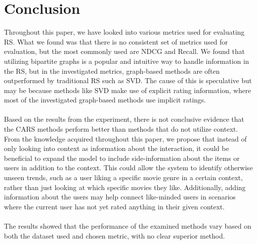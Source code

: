 \section{Conclusion}\label{sec:conclusion}
Throughout this paper, we have looked into various metrics used for evaluating RS. What we found was that there is no consistent set of metrics used for evaluation, but the most commonly used are NDCG and Recall.
We found that utilizing bipartite graphs is a popular and intuitive way to handle information in the RS, but in the investigated metrics, graph-based methods are often outperformed by traditional RS such as SVD.
The cause of this is speculative but may be because methods like SVD make use of explicit rating information, where most of the investigated graph-based methods use implicit ratings.
\\\\
Based on the results from the experiment, there is not conclusive evidence that the CARS methods perform better than methods that do not utilize context.
From the knowledge acquired throughout this paper, we propose that instead of only looking into context as information about the interaction, it could be beneficial to expand the model to include side-information about the items or users in addition to the context.
This could allow the system to identify otherwise unseen trends, such as a user liking a specific movie genre in a certain context, rather than just looking at which specific movies they like.
Additionally, adding information about the users may help connect like-minded users in scenarios where the current user has not yet rated anything in their given context.
\\\\
The results showed that the performance of the examined methods vary based on both the dataset used and chosen metric, with no clear superior method.
